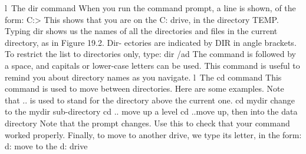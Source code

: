l The dir command
When you run the command prompt, a line is shown, of the form:
C:\TEMP>
This shows that you are on the C: drive, in the directory TEMP. Typing dir shows us the names of all the directories and ﬁles in the current directory, as in Figure 19.2. Dir-
ectories are indicated by DIR in angle brackets. To restrict the list to directories only, type:
dir /ad
The command is followed by a space, and capitals or lower-case letters can be used. This command is useful to remind you about directory names as you navigate.
l The cd command
This command is used to move between directories. Here are some examples. Note that .. is used to stand for the directory above the current one.
cd mydir	change to the mydir sub-directory
cd ..	move up a level
cd ..\data	move up, then into the data directory
Note that the prompt changes. Use this to check that your command worked properly. Finally, to move to another drive, we type its letter, in the form:
d:	move to the d: drive


